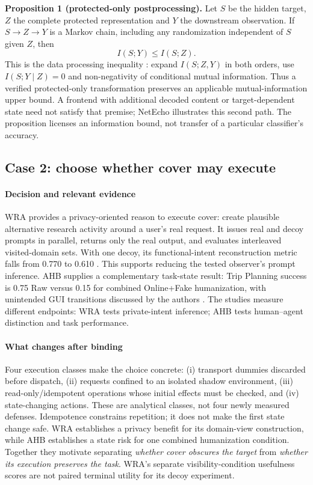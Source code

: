 \noindent\textbf{Proposition 1 (protected-only postprocessing).}
Let $S$ be the hidden target, $Z$ the complete protected representation and $Y$ the downstream observation. If $S\to Z\to Y$ is a Markov chain, including any randomization independent of $S$ given $Z$, then
\[
 I(S;Y)\leq I(S;Z).
\]
This is the data processing inequality \cite[Theorem~2.8.1]{cover2006elements}: expand $I(S;Z,Y)$ in both orders, use $I(S;Y\mid Z)=0$ and non-negativity of conditional mutual information. Thus a verified protected-only transformation preserves an applicable mutual-information upper bound. A frontend with additional decoded content or target-dependent state need not satisfy that premise; NetEcho illustrates this second path. The proposition licenses an information bound, not transfer of a particular classifier's accuracy.

\subsection{Case 2: choose whether cover may execute}
\paragraph{Decision and relevant evidence}
WRA provides a privacy-oriented reason to execute cover: create plausible alternative research activity around a user's real request. It issues real and decoy prompts in parallel, returns only the real output, and evaluates interleaved visited-domain sets. With one decoy, its functional-intent reconstruction metric falls from 0.770 to 0.610 \cite{jeong2026wra}. This supports reducing the tested observer's prompt inference. AHB supplies a complementary task-state result: Trip Planning success is 0.75 Raw versus 0.15 for combined Online+Fake humanization, with unintended GUI transitions discussed by the authors \cite{zhu2026turing}. The studies measure different endpoints: WRA tests private-intent inference; AHB tests human--agent distinction and task performance.

\paragraph{What changes after binding}
Four execution classes make the choice concrete: (i) transport dummies discarded before dispatch, (ii) requests confined to an isolated shadow environment, (iii) read-only/idempotent operations whose initial effects must be checked, and (iv) state-changing actions. These are analytical classes, not four newly measured defenses. Idempotence constrains repetition; it does not make the first state change safe. WRA establishes a privacy benefit for its domain-view construction, while AHB establishes a state risk for one combined humanization condition. Together they motivate separating \emph{whether cover obscures the target} from \emph{whether its execution preserves the task}. WRA's separate visibility-condition usefulness scores are not paired terminal utility for its decoy experiment.

